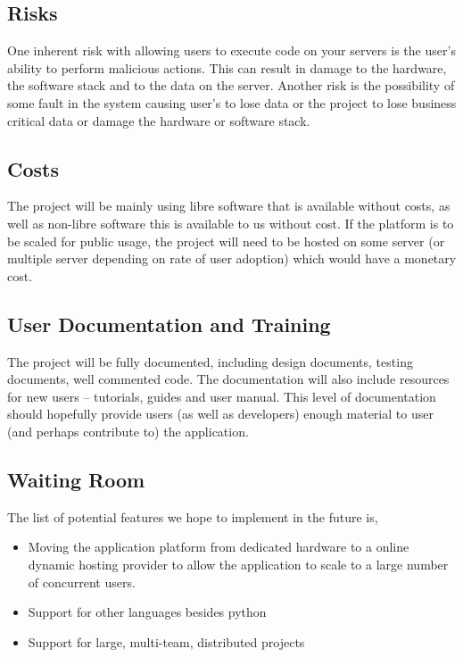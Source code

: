 \documentclass[12pt, titlepage]{article}
\begin{document}
  \subsection{Risks}
  One inherent risk with allowing users to execute code on your servers is the
  user's ability to perform malicious actions. This can result in damage to the
  hardware, the software stack and to the data on the server.  Another risk is
  the possibility of some fault in the system causing user's to lose data or
  the project to lose business critical data or damage the hardware or software
  stack.

  \subsection{Costs}
  The project will be mainly using libre software that
  is available without costs, as well as non-libre software this is available
  to us without cost. If the platform is to be scaled for public usage, the
  project will need to be hosted on some server (or multiple server depending
  on rate of user adoption) which would have a monetary cost.

  \subsection{User Documentation and Training}
	The project will be fully documented, including design documents, testing
	documents, well commented code. The documentation will also include resources
	for new users -- tutorials, guides and user manual. This level of
	documentation should hopefully provide users (as well as developers) enough
	material to user (and perhaps contribute to) the application.

  \subsection{Waiting Room}
	The list of potential features we hope to implement in the future is,
	\begin{itemize}
		\item Moving the application platform from dedicated hardware to a online
			dynamic hosting provider to allow the application to scale to a large
			number of concurrent users.
		\item Support for other languages besides python
		\item Support for large, multi-team, distributed projects
	\end{itemize}
\end{document}
